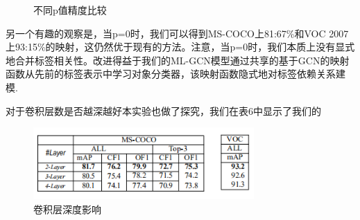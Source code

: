 \begin{figure}[htbp]
	\centering
	\centering
	\caption{不同p值精度比较}
\end{figure}

另一个有趣的观察是，当p=0时，我们可以得到MS-COCO上81:67\%和VOC 2007上93:15\%的映射，这仍然优于现有的方法。注意，当p=0时，我们本质上没有显式地合并标签相关性。改进得益于我们的ML-GCN模型通过共享的基于GCN的映射函数从先前的标签表示中学习对象分类器，该映射函数隐式地对标签依赖关系建模.

对于卷积层数是否越深越好本实验也做了探究，我们在表6中显示了我们的
\begin{figure}[htbp!]
	\centering
	\includegraphics[width=0.75\textwidth]{figures/p4-5.png}
	\caption{卷积层深度影响}\label{fig:p4-5}
	\vspace{-1em}
\end{figure}

